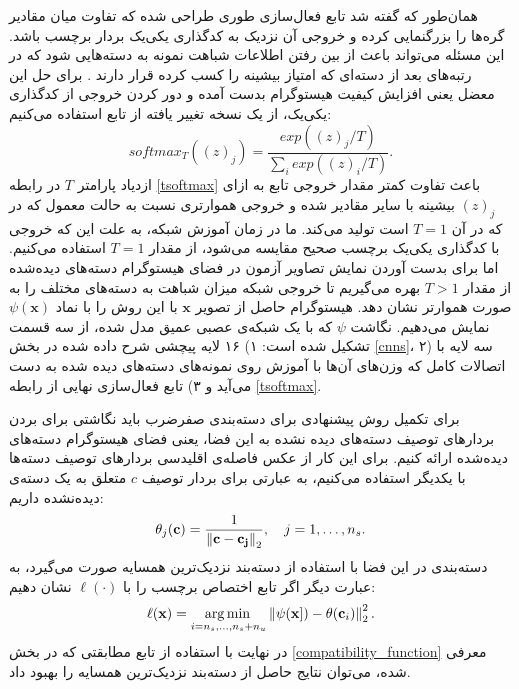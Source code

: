  همان‌طور که گفته شد تابع فعال‌سازی  طوری طراحی شده که تفاوت میان مقادیر گره‌ها را بزرگنمایی کرده و خروجی آن نزدیک به کدگذاری یکی‌یک بردار برچسب باشد. این مسئله می‌تواند باعث از بین رفتن اطلاعات شباهت نمونه به دسته‌هایی شود که در رتبه‌های بعد از دسته‌ای که امتیاز بیشینه را کسب کرده قرار دارند \cite{dark}. برای حل این معضل یعنی افزایش کیفیت هیستوگرام بدست آمده و دور کردن خروجی از کدگذاری یکی‌یک، از یک نسخه تغییر یافته از تابع   استفاده می‌کنیم:
 \begin{equation}
 \label{tsoftmax}
	softmax_T((z)_j) = \frac{exp((z)_j/T)}{\sum_i exp((z)_i/T)}.
 \end{equation}
ازدیاد پارامتر $T$ در رابطه \eqref{tsoftmax} باعث تفاوت کمتر مقدار خروجی تابع به ازای $(z)_j$ بیشینه با سایر مقادیر شده و خروجی هموارتری نسبت به حالت معمول که در که در آن $T=1$ است تولید می‌کند. ما در زمان آموزش شبکه، به علت این که خروجی با کدگذاری یکی‌یک برچسب صحیح مقایسه می‌شود، از مقدار $T=1$ استفاده می‌کنیم. اما برای بدست آوردن نمایش تصاویر آزمون در فضای هیستوگرام دسته‌های دیده‌شده از مقدار $T>1$ بهره می‌گیریم تا خروجی شبکه میزان شباهت به دسته‌های مختلف را به صورت هموارتر نشان دهد. هیستوگرام حاصل از تصویر $\mathbf{x}$ با این روش را با نماد
 $\psi{(\mathbf{x} )}$ نمایش می‌دهیم. نگاشت $\psi$ که با یک شبکه‌ی عصبی عمیق مدل شده، از سه قسمت تشکیل شده است: ۱) ۱۶ لایه پیچشی شرح داده شده در بخش \ref{cnns}،
۲) سه لایه با اتصالات کامل که وزن‌های آن‌ها با آموزش روی نمونه‌های دسته‌های دیده شده به دست می‌آید و ۳) تابع فعال‌سازی نهایی از رابطه \ref{tsoftmax}.

برای تکمیل روش‌ پیشنهادی برای دسته‌بندی صفرضرب باید نگاشتی برای بردن بردارهای توصیف دسته‌های دیده نشده به این فضا، یعنی فضای هیستوگرام دسته‌های دیده‌شده ارائه کنیم. برای این کار از عکس فاصله‌ی اقلیدسی بردارهای توصیف دسته‌ها با یکدیگر استفاده می‌کنیم، به عبارتی برای بردار توصیف $c$ متعلق به یک دسته‌ی دیده‌نشده داریم:
 \begin{equation}
\theta_j(\mathbf{c}) = \frac{1}{\left \lVert \mathbf{c - c_j} \right \rVert_2  }, \quad j=1,\ldots, n_s.
\end{equation}
 دسته‌بندی در این فضا با استفاده از  دسته‌بند نزدیک‌ترین همسایه صورت می‌گیرد، به عبارت دیگر اگر تابع اختصاص برچسب را با $\ell(\cdot)$ نشان دهیم:
\begin{equation}
\ell(\mathbf{x}) = \operatorname*{arg\,min\,}_{i=n_s, \ldots, n_s+n_u} \left \lVert \psi(\mathbf{x}]) - \theta(\mathbf{c}_i) \right \rVert_2^2.
\end{equation}
در نهایت با استفاده از تابع مطابقتی که در بخش \ref{compatibility_function} معرفی شده، می‌توان نتایج حاصل از دسته‌بند نزدیک‌ترین همسایه را بهبود داد.

